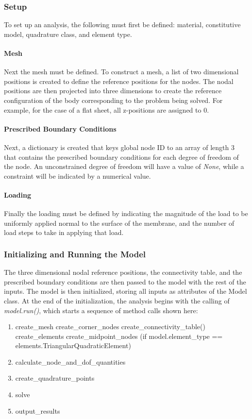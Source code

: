 \documentclass[]{spie}  %
\begin{document}
\subsubsection{Setup}
To set up an analysis, the following must first be defined: material, constitutive model, quadrature class, and element type. 

\paragraph{Mesh}
Next the mesh must be defined. To construct a mesh, a list of two dimensional positions is created to define the reference positions for the nodes. The nodal positions are then projected into three dimensions to create the reference configuration of the body corresponding to the problem being solved. For example, for the case of a flat sheet, all z-positions are assigned to 0. 

\paragraph{Prescribed Boundary Conditions}
Next, a dictionary is created that keys global node ID to an array of length 3 that contains the prescribed boundary conditions for each degree of freedom of the node. An unconstrained degree of freedom will have a value of \textit{None}, while a constraint will be indicated by a numerical value. 

\paragraph{Loading}
Finally the loading must be defined by indicating the magnitude of the load to be uniformly applied normal to the surface of the membrane, and the number of load steps to take in applying that load.  

\subsubsection{Initializing and Running the Model}
The three dimensional nodal reference positions, the connectivity table, and the prescribed boundary conditions are then passed to the model with the rest of the inputs. The model is then initialized, storing all inputs as attributes of the Model class. At the end of the initialization, the analysis begins with the calling of \textit{model.run()}, which starts a sequence of method calls shown here:

\begin{enumerate}
	\item create\_mesh
	\subitem create\_corner\_nodes
	\subitem create\_connectivity\_table()
	\subitem create\_elements
	\subitem create\_midpoint\_nodes (if model.element\_type == elements.TriangularQuadraticElement)
	\item calculate\_node\_and\_dof\_quantities
	\item create\_quadrature\_points
	\item solve
	\item output\_results
\end{enumerate}
\end{document}
